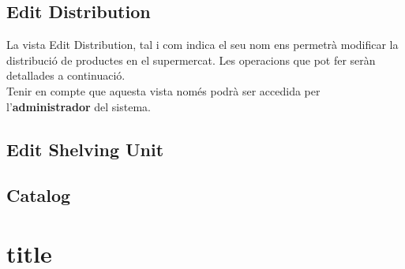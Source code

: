 \documentclass[a4paper,12pt]{article}
\begin{document}
	\newpage
	\subsection*{Edit Distribution}
	
	La vista Edit Distribution, tal i com indica el seu nom ens permetrà modificar la distribució de productes en el supermercat. Les operacions que pot fer seràn detallades a continuació. \\
	
	Tenir en compte que aquesta vista només podrà ser accedida per l'\textbf{administrador} del sistema.
	
	\newpage
	\subsection*{Edit Shelving Unit}
	
	\newpage
	\subsection*{Catalog}
	
	
	
	\section{title}
	
\end{document}
